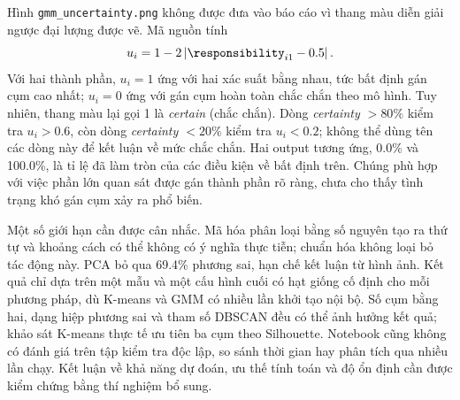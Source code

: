 Hình \texttt{gmm\_uncertainty.png} không được đưa vào báo cáo vì thang màu
diễn giải ngược đại lượng được vẽ. Mã nguồn tính
\[
 u_i=1-2\left|\responsibility_{i1}-0.5\right|.
\]
Với hai thành phần, $u_i=1$ ứng với hai xác suất bằng nhau, tức bất định
gán cụm cao nhất; $u_i=0$ ứng với gán cụm hoàn toàn chắc chắn theo mô hình.
Tuy nhiên, thang màu lại gọi 1 là \emph{certain} (chắc chắn).
Dòng \emph{certainty $>80\%$} kiểm tra $u_i>0.6$, còn dòng
\emph{certainty $<20\%$} kiểm tra $u_i<0.2$; không thể dùng tên các dòng này
để kết luận về mức chắc chắn. Hai output tương ứng, 0.0\% và 100.0\%,
là tỉ lệ đã làm tròn của các điều kiện về bất định trên. Chúng phù hợp với
việc phần lớn quan sát được gán thành phần rõ ràng, chưa cho thấy tình trạng
khó gán cụm xảy ra phổ biến.

Một số giới hạn cần được cân nhắc. Mã hóa phân loại bằng số nguyên tạo ra
thứ tự và khoảng cách có thể không có ý nghĩa thực tiễn; chuẩn hóa không
loại bỏ tác động này. PCA bỏ qua 69.4\% phương sai, hạn chế kết luận từ
hình ảnh. Kết quả chỉ dựa trên một mẫu và một cấu hình cuối có hạt giống
cố định cho mỗi phương pháp, dù K-means và GMM có nhiều lần khởi tạo nội bộ.
Số cụm bằng hai, dạng hiệp phương sai và tham số DBSCAN đều có thể ảnh hưởng
kết quả; khảo sát K-means thực tế ưu tiên ba cụm theo Silhouette.
Notebook cũng không có đánh giá trên tập kiểm tra độc lập, so sánh thời gian
hay phân tích qua nhiều lần chạy. Kết luận về khả năng dự đoán, ưu thế
tính toán và độ ổn định cần được kiểm chứng bằng thí nghiệm bổ sung.
